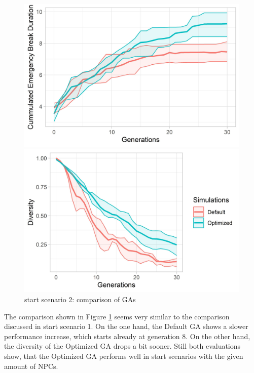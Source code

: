 \begin{figure}[ht] 
	\begin{minipage}[b]{0.5\linewidth}
		\centering
		\includegraphics[width=1\linewidth]{simulations/evaluation/plots/sim_2_ga_generations} 
	\end{minipage}%
	\begin{minipage}[b]{0.5\linewidth}
		\centering
		\includegraphics[width=1\linewidth]{simulations/evaluation/plots/sim_2_ga_diversity} 
	\end{minipage} 
	\caption{start scenario 2: comparison of GAs}
	\label{fig:evaluation:sim_2_ga_comparison}
\end{figure}

The comparison shown in Figure \ref{fig:evaluation:sim_2_ga_comparison} seems very similar to the comparison discussed in start scenario 1. On the one hand, the Default GA shows a slower performance increase, which starts already at generation 8. On the other hand, the diversity of the Optimized GA drops a bit sooner. Still both evaluations show, that the Optimized GA performs well in start scenarios with the given amount of NPCs.


